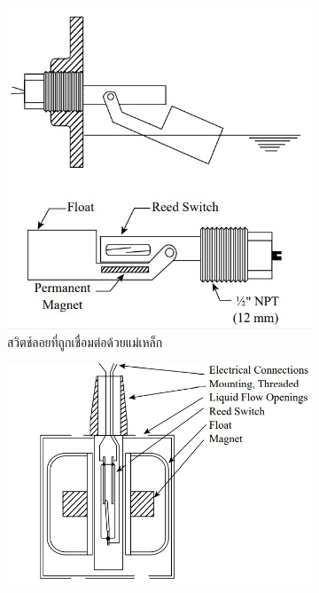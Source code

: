 \documentclass[final,11pt]{article}
\begin{document}
\begin{figure}
    \begin{subfigure}[b]{0.33\textwidth}
        \centering
        \includegraphics[width=\textwidth]{images/Screenshot_1.jpg}
        \caption{สวิตช์ลอยที่ถูกเชื่อมต่อด้วยแม่เหล็ก}
        \label{fig:mcfs1}
    \end{subfigure}
    \hfill
    \begin{subfigure}[b]{0.4\textwidth}
        \centering
        \includegraphics[width=\textwidth]{images/Screenshot_2.jpg}

\end{subfigure}
\end{figure}
\end{document}
